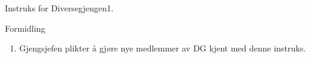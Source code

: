 \begin{instruks}{Instruks for Diversegjengen}{1. }{ }
    \begin{instruksledd}{Formidling}
        \begin{enumerate}
            \item Gjengsjefen plikter å gjøre nye medlemmer av DG kjent med denne instruks.
        \end{enumerate}
    \end{instruksledd}


\end{instruks}


